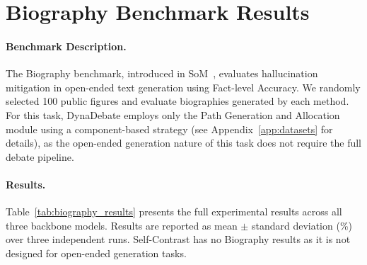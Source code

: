 \section{Biography Benchmark Results}
\label{app:biography}

\paragraph{Benchmark Description.}
The Biography benchmark, introduced in SoM~\cite{du2023improving}, evaluates hallucination mitigation in open-ended text generation using Fact-level Accuracy. We randomly selected 100 public figures and evaluate biographies generated by each method. For this task, DynaDebate employs only the Path Generation and Allocation module using a component-based strategy (see Appendix~\ref{app:datasets} for details), as the open-ended generation nature of this task does not require the full debate pipeline.

\paragraph{Results.}
Table~\ref{tab:biography_results} presents the full experimental results across all three backbone models. Results are reported as mean $\pm$ standard deviation (\%) over three independent runs. Self-Contrast has no Biography results as it is not designed for open-ended generation tasks.

